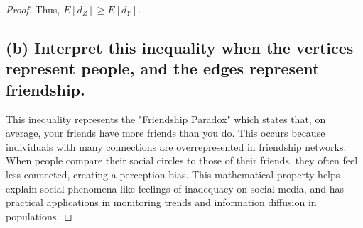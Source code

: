\documentclass[letterpaper, 11pt]{article}
\newcommand{\1}{\mathds{1}}	%
\theoremstyle{definition}
\begin{document}
\begin{proof}
Thus, $E[d_Z] \geq E[d_Y]$.

\subsection*{(b) Interpret this inequality when the vertices represent people, and the edges represent friendship.}

This inequality represents the "Friendship Paradox" which states that, on average, your friends have more friends than you do. This occurs because individuals with many connections are overrepresented in friendship networks. When people compare their social circles to those of their friends, they often feel less connected, creating a perception bias. This mathematical property helps explain social phenomena like feelings of inadequacy on social media, and has practical applications in monitoring trends and information diffusion in populations.
\end{proof}
\end{document}
